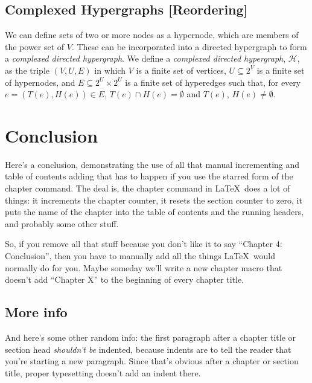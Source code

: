 \documentclass[12pt,twoside]{reedthesis}
\newcommand{\new}[2]{{\color{purple}#1 [#2]}}
\theoremstyle{definition}
\begin{document}
 \section{\new{Complexed Hypergraphs}{Reordering}}

 \new{
 We can define sets of two or more nodes as a hypernode, which are members of the power set of $V$.  These can be incorporated into a directed hypergraph to form a \textit{complexed directed hypergraph}.  We define a \textit{complexed directed hypergraph}, $\mathcal{H}$, as the triple $(V,U,E)$ in which $V$ is a finite set of vertices, $U \subseteq 2^V$ is a finite set of hypernodes, and $E \subseteq 2^U \times 2^U$ is a finite set of hyperedges such that, for every $e=(T(e),H(e)) \in E$, $T(e) \cap H(e) = \emptyset$ and $T(e)$, $H(e) \neq \emptyset$.\par}{Reordering}

\chapter*{Conclusion}
	\setcounter{chapter}{4}
	\setcounter{section}{0}

Here's a conclusion, demonstrating the use of all that manual incrementing and table of contents adding that has to happen if you use the starred form of the chapter command. The deal is, the chapter command in \LaTeX\ does a lot of things: it increments the chapter counter, it resets the section counter to zero, it puts the name of the chapter into the table of contents and the running headers, and probably some other stuff.

So, if you remove all that stuff because you don't like it to say ``Chapter 4: Conclusion'', then you have to manually add all the things \LaTeX\ would normally do for you. Maybe someday we'll write a new chapter macro that doesn't add ``Chapter X'' to the beginning of every chapter title.

\section{More info}
And here's some other random info: the first paragraph after a chapter title or section head \emph{shouldn't be} indented, because indents are to tell the reader that you're starting a new paragraph. Since that's obvious after a chapter or section title, proper typesetting doesn't add an indent there.
\end{document}
